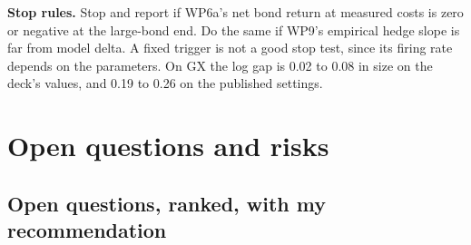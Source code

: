 \documentclass[10pt,a4paper]{article}
\begin{document}
\textbf{Stop rules.} Stop and report if WP6a's net bond return at measured costs is zero or negative at the large-bond end. Do the same if WP9's empirical hedge slope is far from model delta. A fixed trigger is not a good stop test, since its firing rate depends on the parameters. On GX the log gap is 0.02 to 0.08 in size on the deck's values, and 0.19 to 0.26 on the published settings.

\section{Open questions and risks}\label{sec:questions}

\subsection*{Open questions, ranked, with my recommendation}
\end{document}

